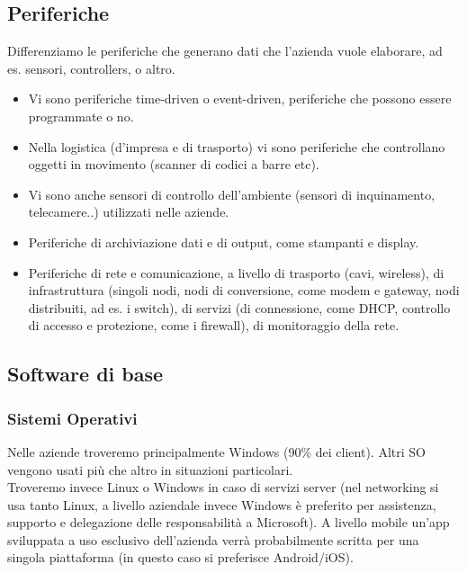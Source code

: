 \subsection{Periferiche}
Differenziamo le periferiche che generano dati che l'azienda vuole elaborare, ad es. sensori, controllers, o altro.
\begin{itemize}
  \item Vi sono periferiche time-driven o event-driven, periferiche che possono essere programmate o no.
  \item Nella logistica (d'impresa e di trasporto) vi sono periferiche che controllano oggetti in movimento (scanner di codici a barre etc).
  \item Vi sono anche sensori di controllo dell'ambiente (sensori di inquinamento, telecamere..) utilizzati nelle aziende.
  \item Periferiche di archiviazione dati e di output, come stampanti e display.
  \item Periferiche di rete e comunicazione, a livello di trasporto (cavi, wireless), di infrastruttura (singoli nodi, nodi di conversione, come modem e gateway, nodi distribuiti, ad es. i switch), di servizi (di connessione, come DHCP, controllo di accesso e protezione, come i firewall), di monitoraggio della rete.
\end{itemize}

\subsection{Software di base}
\subsubsection{Sistemi Operativi}
Nelle aziende troveremo principalmente Windows (90\% dei client). Altri SO vengono usati
pi\`u che altro in situazioni particolari. \\
Troveremo invece Linux o Windows in caso di servizi server (nel networking si usa tanto Linux, a livello
aziendale invece Windows \`e preferito per assistenza, supporto e delegazione delle responsabilit\`a a Microsoft).
A livello mobile un'app sviluppata a uso esclusivo dell'azienda verr\`a probabilmente scritta per una singola piattaforma (in questo caso si preferisce Android/iOS).
